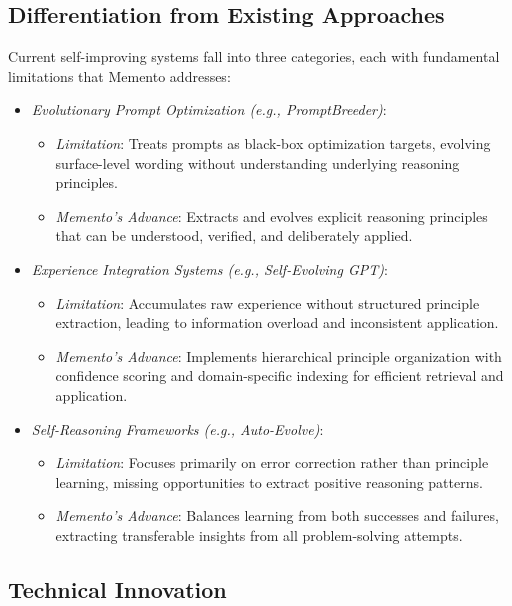 \documentclass[10pt,a4paper,twocolumn]{article}
\begin{document}
\subsection{Differentiation from Existing Approaches}

Current self-improving systems fall into three categories, each with fundamental limitations that Memento addresses:

\begin{itemize}
    \item \textit{Evolutionary Prompt Optimization (e.g., PromptBreeder)}:
    \begin{itemize}
\item \textit{Limitation}: Treats prompts as black-box optimization targets, evolving surface-level wording without understanding underlying reasoning principles.
\item \textit{Memento's Advance}: Extracts and evolves explicit reasoning principles that can be understood, verified, and deliberately applied.
\end{itemize}

    \item \textit{Experience Integration Systems (e.g., Self-Evolving GPT)}:
        \begin{itemize}
\item \textit{Limitation}: Accumulates raw experience without structured principle extraction, leading to information overload and inconsistent application.

\item \textit{Memento's Advance}: Implements hierarchical principle organization with confidence scoring and domain-specific indexing for efficient retrieval and application.
\end{itemize}

\item \textit{Self-Reasoning Frameworks (e.g., Auto-Evolve)}:
\begin{itemize}
\item \textit{Limitation}: Focuses primarily on error correction rather than principle learning, missing opportunities to extract positive reasoning patterns.
\item \textit{Memento's Advance}: Balances learning from both successes and failures, extracting transferable insights from all problem-solving attempts.
\end{itemize}

\end{itemize}
\subsection{Technical Innovation}
\end{document}
